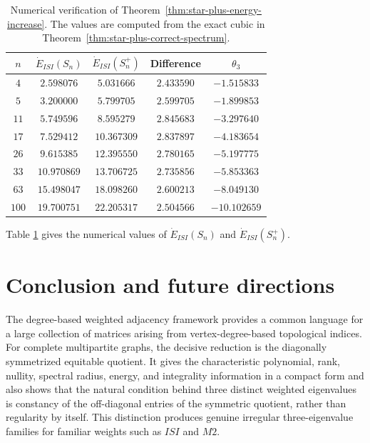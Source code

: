 \documentclass[12pt,twoside]{article}
\begin{document}
\begin{table}[H]
	\centering
	\small
	\begin{tabular}{|c|c|c|c|c|}
		\hline
		$n$ & $\dot E_{ISI}(S_n)$ & $\dot E_{ISI}(S_n^+)$ & Difference & $\theta_3$\\
		\hline
		$4$ & $2.598076$ & $5.031666$ & $2.433590$ & $-1.515833$\\
		\hline
		$5$ & $3.200000$ & $5.799705$ & $2.599705$ & $-1.899853$\\
		\hline
		$11$ & $5.749596$ & $8.595279$ & $2.845683$ & $-3.297640$\\
		\hline
		$17$ & $7.529412$ & $10.367309$ & $2.837897$ & $-4.183654$\\
		\hline
		$26$ & $9.615385$ & $12.395550$ & $2.780165$ & $-5.197775$\\
		\hline
		$33$ & $10.970869$ & $13.706725$ & $2.735856$ & $-5.853363$\\
		\hline
		$63$ & $15.498047$ & $18.098260$ & $2.600213$ & $-8.049130$\\
		\hline
		$100$ & $19.700751$ & $22.205317$ & $2.504566$ & $-10.102659$\\
		\hline
	\end{tabular}
	\caption{Numerical verification of Theorem~\ref{thm:star-plus-energy-increase}. The values are computed from the exact cubic in Theorem~\ref{thm:star-plus-correct-spectrum}.}
	\label{tab:star-plus-corrected}
\end{table}

Table \ref{tab:star-plus-corrected} gives the numerical values of $\dot E_{ISI}(S_n)$ and  $\dot E_{ISI}(S_n^+)$.


\section{Conclusion and future directions}\label{section 6}

The degree-based weighted adjacency framework provides a common language for a large collection of matrices arising from vertex-degree-based topological indices. For complete multipartite graphs, the decisive reduction is the diagonally symmetrized equitable quotient. It gives the characteristic polynomial, rank, nullity, spectral radius, energy, and integrality information in a compact form and also shows that the natural condition behind three distinct weighted eigenvalues is constancy of the off-diagonal entries of the symmetric quotient, rather than regularity by itself. This distinction produces genuine irregular three-eigenvalue families for familiar weights such as $ISI$ and $M2$. 
\end{document}
